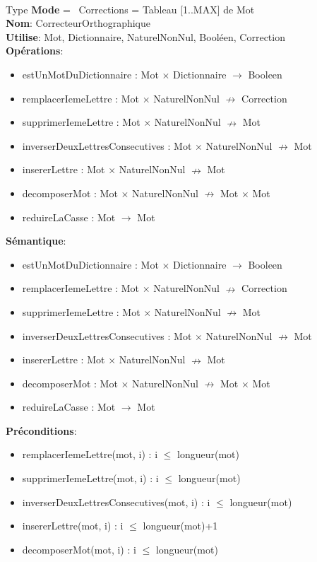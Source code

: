 \documentclass{article}
\begin{document}
    \noindent
    \\
    Type \textbf{Mode} = \ Corrections = Tableau [1..MAX] de Mot  \\
    \textbf{Nom}: CorrecteurOrthographique \\
    \textbf{Utilise}: Mot, Dictionnaire, NaturelNonNul, Booléen, Correction\\
    \textbf{Opérations}: \begin{itemize}[label=$\ $, leftmargin=2cm, itemsep=0cm]
        \item estUnMotDuDictionnaire : Mot $\times$ Dictionnaire $\rightarrow$ Booleen
        \item remplacerIemeLettre : Mot $\times$ NaturelNonNul $\nrightarrow$ Correction
        \item supprimerIemeLettre : Mot $\times$ NaturelNonNul $\nrightarrow$ Mot
        \item inverserDeuxLettresConsecutives : Mot $\times$ NaturelNonNul $\nrightarrow$ Mot
        \item insererLettre : Mot $\times$ NaturelNonNul $\nrightarrow$ Mot
        \item decomposerMot : Mot $\times$ NaturelNonNul $\nrightarrow$ Mot $\times$ Mot
        \item reduireLaCasse : Mot $\rightarrow$ Mot
    \end{itemize}
    
    \textbf{Sémantique}: \begin{itemize}[label=$\- $, leftmargin=2cm, itemsep=0cm]
        \item estUnMotDuDictionnaire : Mot $\times$ Dictionnaire $\rightarrow$ Booleen
        \item remplacerIemeLettre : Mot $\times$ NaturelNonNul $\nrightarrow$ Correction
        \item supprimerIemeLettre : Mot $\times$ NaturelNonNul $\nrightarrow$ Mot
        \item inverserDeuxLettresConsecutives : Mot $\times$ NaturelNonNul $\nrightarrow$ Mot
        \item insererLettre : Mot $\times$ NaturelNonNul $\nrightarrow$ Mot
        \item decomposerMot : Mot $\times$ NaturelNonNul $\nrightarrow$ Mot $\times$ Mot
        \item reduireLaCasse : Mot $\rightarrow$ Mot
    \end{itemize}

    \textbf{Préconditions}: \begin{itemize}[label=$\- $, leftmargin=2cm, itemsep=0cm]
        \item remplacerIemeLettre(mot, i) : i $\leq$ longueur(mot)
        \item supprimerIemeLettre(mot, i) : i $\leq$ longueur(mot)
        \item inverserDeuxLettresConsecutives(mot, i) : i $\leq$ longueur(mot)
        \item insererLettre(mot, i) : i $\leq$ longueur(mot)+1
        \item decomposerMot(mot, i) : i $\leq$ longueur(mot)
    \end{itemize}
\end{document}
